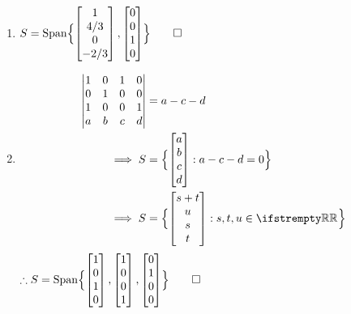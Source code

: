 \documentclass[12pt, a4paper]{article}
\begin{document}
\begin{enumerate}[Q\arabic*.]
\begin{enumerate}[(\alph*)]
      \item $S = \operatorname{Span}\Bigl\{\begin{bmatrix}1\\4/3\\0\\-2/3\end{bmatrix}, \begin{bmatrix}0\\0\\1\\0\end{bmatrix} \Bigr\} \qed$
      \item 
        \begin{align*}
          \begin{vmatrix}
            1&0&1&0\\
            0&1&0&0\\
            1&0&0&1\\
            a&b&c&d
          \end{vmatrix} &= a-c-d\\
          \implies S &= \Bigl\{\begin{bmatrix}a\\b\\c\\d\end{bmatrix}: a - c- d = 0\Bigr\}\\
           \implies S &= \Bigl\{\begin{bmatrix}s+t\\u\\s\\t\end{bmatrix}: s,t,u \in \RR\Bigr\}\\
        \end{align*}
        $\therefore S = \operatorname{Span}\Bigl\{\begin{bmatrix}1\\0\\1\\0\end{bmatrix}, \begin{bmatrix}1\\0\\0\\1\end{bmatrix}, \begin{bmatrix}0\\1\\0\\0\end{bmatrix} \Bigr\} \qed$

\end{enumerate}
\end{enumerate}
\end{document}

